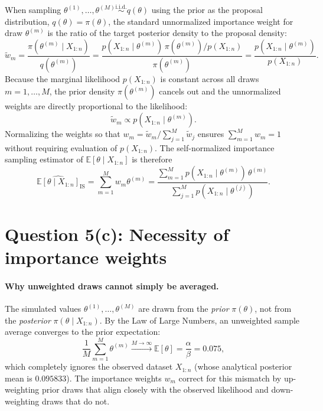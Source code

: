 When sampling $\theta^{(1)}, \dots, \theta^{(M)} \stackrel{\text{i.i.d.}}{\sim} q(\theta)$ using the prior as the proposal distribution, $q(\theta) = \pi(\theta)$, the standard unnormalized importance weight for draw $\theta^{(m)}$ is the ratio of the target posterior density to the proposal density:
\[
\tilde{w}_m
= \frac{\pi(\theta^{(m)} \mid X_{1:n})}{q(\theta^{(m)})}
= \frac{p(X_{1:n} \mid \theta^{(m)})\,\pi(\theta^{(m)}) / p(X_{1:n})}{\pi(\theta^{(m)})}
= \frac{p(X_{1:n} \mid \theta^{(m)})}{p(X_{1:n})}.
\]
Because the marginal likelihood $p(X_{1:n})$ is constant across all draws $m = 1, \dots, M$, the prior density $\pi(\theta^{(m)})$ cancels out and the unnormalized weights are directly proportional to the likelihood:
\[
\boxed{\tilde{w}_m \propto p(X_{1:n} \mid \theta^{(m)}).}
\]
Normalizing the weights so that $w_m = \tilde{w}_m / \sum_{j=1}^{M} \tilde{w}_j$ ensures $\sum_{m=1}^{M} w_m = 1$ without requiring evaluation of $p(X_{1:n})$. The self-normalized importance sampling estimator of $\mathbb{E}[\theta \mid X_{1:n}]$ is therefore
\[
\boxed{\widehat{\mathbb{E}[\theta \mid X_{1:n}]}_{\mathrm{IS}}
= \sum_{m=1}^{M} w_m \theta^{(m)}
= \frac{\sum_{m=1}^{M} p(X_{1:n} \mid \theta^{(m)})\,\theta^{(m)}}{\sum_{j=1}^{M} p(X_{1:n} \mid \theta^{(j)})}.}
\]

\section*{Question 5(c): Necessity of importance weights}

\paragraph{Why unweighted draws cannot simply be averaged.}
The simulated values $\theta^{(1)}, \dots, \theta^{(M)}$ are drawn from the \emph{prior} $\pi(\theta)$, not from the \emph{posterior} $\pi(\theta \mid X_{1:n})$. By the Law of Large Numbers, an unweighted sample average converges to the prior expectation:
\[
\frac{1}{M}\sum_{m=1}^{M} \theta^{(m)} \xrightarrow{M \to \infty} \mathbb{E}[\theta] = \frac{\alpha}{\beta} = 0.075,
\]
which completely ignores the observed dataset $X_{1:n}$ (whose analytical posterior mean is $0.095833$). The importance weights $w_m$ correct for this mismatch by up-weighting prior draws that align closely with the observed likelihood and down-weighting draws that do not.

